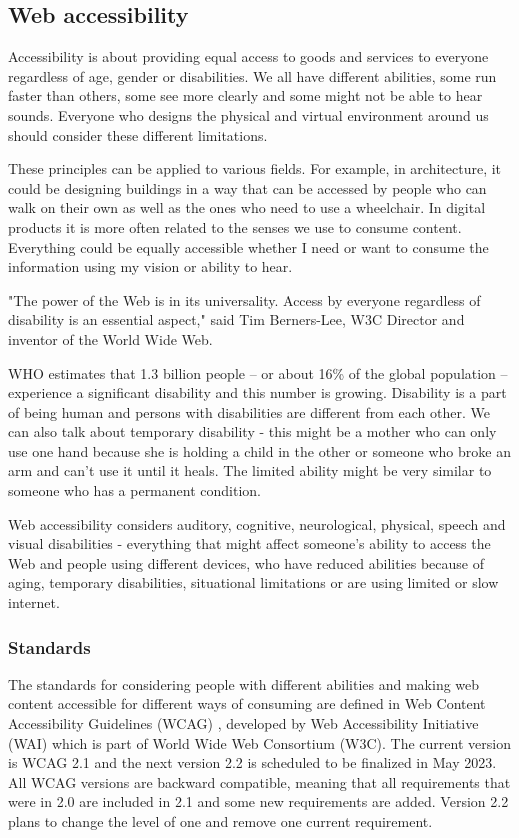 \documentclass{master_thesis}
\begin{document}
\subsection{Web accessibility}

Accessibility is about providing equal access to goods and services to everyone regardless of age, gender or disabilities. We all have different abilities, some run faster than others, some see more clearly and some might not be able to hear sounds. Everyone who designs the physical and virtual environment around us should consider these different limitations.

These principles can be applied to various fields. For example, in architecture, it could be designing buildings in a way that can be accessed by people who can walk on their own as well as the ones who need to use a wheelchair. In digital products it is more often related to the senses we use to consume content. Everything could be equally accessible whether I need or want to consume the information using my vision or ability to hear.

"The power of the Web is in its universality. Access by everyone regardless of disability is an essential aspect," said Tim Berners-Lee, W3C Director and inventor of the World Wide Web\citep{WWWC1997}.

WHO estimates that 1.3 billion people – or about 16\% of the global population – experience a significant disability and this number is growing. Disability is a part of being human and persons with disabilities are different from each other.\citep{WHO2022} We can also talk about temporary disability - this might be a mother who can only use one hand because she is holding a child in the other or someone who broke an arm and can't use it until it heals. The limited ability might be very similar to someone who has a permanent condition.

Web accessibility considers auditory, cognitive, neurological, physical, speech and visual disabilities - everything that might affect someone's ability to access the Web and people using different devices, who have reduced abilities because of aging, temporary disabilities, situational limitations or are using limited or slow internet. \citep{Henry2022}

\subsubsection{Standards}

The standards for considering people with different abilities and making web content accessible for different ways of consuming are defined in Web Content Accessibility Guidelines (WCAG) \citep{Kirkpatrick2018}, developed by Web Accessibility Initiative (WAI) which is part of World Wide Web Consortium (W3C). The current version is WCAG 2.1 and the next version 2.2 is scheduled to be finalized in May 2023. All WCAG versions are backward compatible, meaning that all requirements that were in 2.0 are included in 2.1 and some new requirements are added. Version 2.2 plans to change the level of one and remove one current requirement. \citep{Henry2023}
\end{document}
